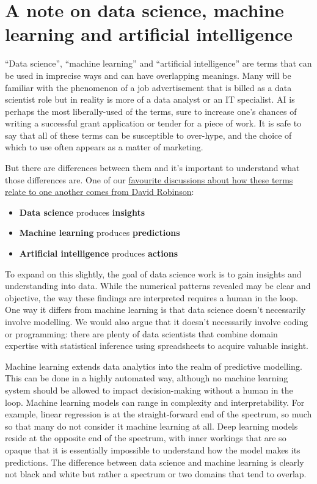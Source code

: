 \documentclass[
]{book}
\providecommand{\tightlist}{%
  \setlength{\itemsep}{0pt}\setlength{\parskip}{0pt}}
\begin{document}
\hypertarget{a-note-on-data-science-machine-learning-and-artificial-intelligence}{%
\section{A note on data science, machine learning and artificial intelligence}\label{a-note-on-data-science-machine-learning-and-artificial-intelligence}}

``Data science'', ``machine learning'' and ``artificial intelligence'' are terms that can be used in imprecise ways and can have overlapping meanings. Many will be familiar with the phenomenon of a job advertisement that is billed as a data scientist role but in reality is more of a data analyst or an IT specialist. AI is perhaps the most liberally-used of the terms, sure to increase one's chances of writing a successful grant application or tender for a piece of work. It is safe to say that all of these terms can be susceptible to over-hype, and the choice of which to use often appears as a matter of marketing.

But there are differences between them and it's important to understand what those differences are. One of our \href{http://varianceexplained.org/r/ds-ml-ai/}{favourite discussions about how these terms relate to one another comes from David Robinson}:

\begin{itemize}
\tightlist
\item
  \textbf{Data science} produces \textbf{insights}
\item
  \textbf{Machine learning} produces \textbf{predictions}
\item
  \textbf{Artificial intelligence} produces \textbf{actions}
\end{itemize}

To expand on this slightly, the goal of data science work is to gain insights and understanding into data. While the numerical patterns revealed may be clear and objective, the way these findings are interpreted requires a human in the loop. One way it differs from machine learning is that data science doesn't necessarily involve modelling. We would also argue that it doesn't necessarily involve coding or programming: there are plenty of data scientists that combine domain expertise with statistical inference using spreadsheets to acquire valuable insight.

Machine learning extends data analytics into the realm of predictive modelling. This can be done in a highly automated way, although no machine learning system should be allowed to impact decision-making without a human in the loop. Machine learning models can range in complexity and interpretability. For example, linear regression is at the straight-forward end of the spectrum, so much so that many do not consider it machine learning at all. Deep learning models reside at the opposite end of the spectrum, with inner workings that are so opaque that it is essentially impossible to understand how the model makes its predictions. The difference between data science and machine learning is clearly not black and white but rather a spectrum or two domains that tend to overlap.
\end{document}
